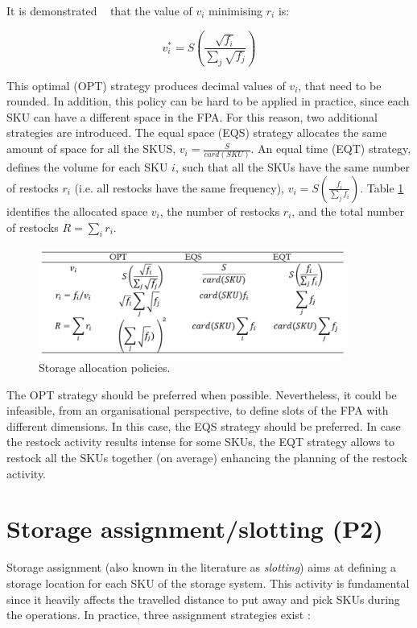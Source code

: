 It is demonstrated ~\cite{Bartholdi2017} that the value of $v_i$ minimising $r_i$ is:

\begin{equation}
    v_i^\ast=S\left(\frac{\sqrt{f_i}}{\sum_{j}\sqrt{f_j}}\right)
\end{equation}

This optimal (OPT) strategy produces decimal values of $v_i$, that need to be rounded. In addition, this policy can be hard to be applied in practice, since each SKU can have a different space in the FPA. For this reason, two additional strategies are introduced. The equal space (EQS)  strategy allocates the same amount of space for all the SKUS, $v_i=\frac{S}{card\left(SKU\right)}$. An equal time (EQT) strategy, defines the volume for each SKU $i$, such that all the SKUs have the same number of restocks $r_i$ (i.e. all restocks have the same frequency), $v_i=S\left(\frac{f_i}{\sum_{j} f_i}\right)$. Table \ref{tab_allocation} identifies the allocated space $v_i$, the number of restocks $r_i$, and the total number of restocks $R=\sum_{i} r_i$.

\begin{figure}[hbt!]
\centering
\includegraphics[width=0.9\textwidth]{SectionWarehouses/design_figures/tab_allocation.png}
\captionsetup{type=table}
\caption{Storage allocation policies.}
\label{tab_allocation}
\end{figure}

The OPT strategy should be preferred when possible. Nevertheless, it could be infeasible, from an organisational perspective, to define slots of the FPA with different dimensions. In this case, the EQS strategy should be preferred. In case the restock activity results intense for some SKUs, the EQT strategy allows to restock all the SKUs together (on average) enhancing the planning of the restock activity.

\section{Storage assignment/slotting (P2)}
Storage assignment (also known in the literature as \textit{slotting}) aims at defining a storage location for each SKU of the storage system. This activity is fundamental since it heavily affects the travelled distance to put away and pick SKUs during the operations. In practice, three assignment strategies exist \cite{Accorsi2017_stockSafety, Ang2012, Battini2015, Bortolini2015, Cardona2016, Chen2011, Fontana2014, Goetschalckx1990, Guerriero2013, Guo2016, Jarvis1991, Kallina1976, Larson1997, Le-Duc1999, Mallette1972, Malmborg1989, Manzini2015b, MuppaniMuppant2008, Pan2015, Quintanilla2015, Sooksaksun2012, Xie2014}:

